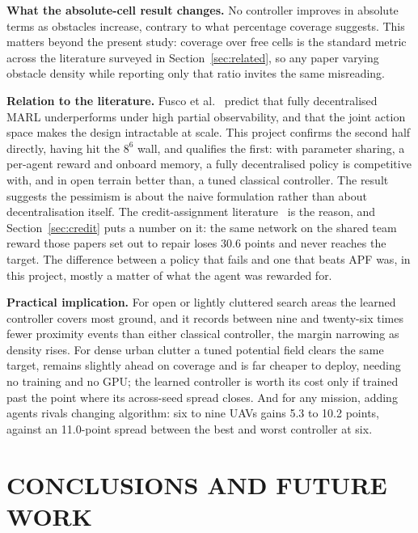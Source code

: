 \documentclass[a4paper, 10pt, conference]{ieeeconf}
\begin{document}
\textbf{What the absolute-cell result changes.} No controller improves
in absolute terms as obstacles increase, contrary to what percentage
coverage suggests. This matters beyond the present study: coverage
over free cells is the standard metric across the literature surveyed
in Section~\ref{sec:related}, so any paper varying obstacle density
while reporting only that ratio invites the same misreading.

\textbf{Relation to the literature.} Fusco et al.~\cite{fusco2025}
predict that fully decentralised MARL underperforms under high partial
observability, and that the joint action space makes the design
intractable at scale. This project confirms the second half directly,
having hit the $8^6$ wall, and qualifies the first: with parameter
sharing, a per-agent reward and onboard memory, a fully decentralised
policy is competitive with, and in open terrain better than, a tuned
classical controller. The result suggests the pessimism is about the
naive formulation rather than about decentralisation itself. The
credit-assignment literature~\cite{foerster2018,sunehag2018,rashid2018}
is the reason, and Section~\ref{sec:credit} puts a number on it: the
same network on the shared team reward those papers set out to repair
loses 30.6 points and never reaches the target. The difference between
a policy that fails and one that beats APF was, in this project,
mostly a matter of what the agent was rewarded for.

\textbf{Practical implication.} For open or lightly cluttered search
areas the learned controller covers most ground, and it records
between nine and twenty-six times fewer proximity events than either
classical controller, the margin narrowing as density rises. For dense urban clutter a tuned potential field clears the
same target, remains slightly ahead on coverage and is far cheaper to
deploy, needing no training and no GPU; the learned controller is
worth its cost only if trained past the point where its across-seed
spread closes. And for any mission, adding agents rivals changing algorithm: six to
nine UAVs gains 5.3 to 10.2 points, against an 11.0-point spread
between the best and worst controller at six.

\section{CONCLUSIONS AND FUTURE WORK}\label{sec:conclusion}
\end{document}
